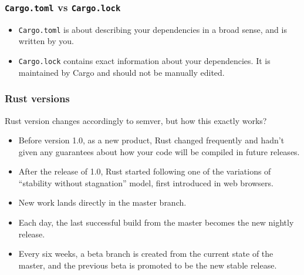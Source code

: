 \documentclass[aspectratio=1610,t]{beamer}
\begin{document}

\begin{frame}[fragile]
\frametitle{\texttt{Cargo.toml} vs \texttt{Cargo.lock}}
\begin{itemize}
    \item \texttt{Cargo.toml} is about describing your dependencies in a broad sense, and is written by you.
    \item \texttt{Cargo.lock} contains exact information about your dependencies. It is maintained by Cargo and should not be manually edited.
\end{itemize}



\end{frame}


\begin{frame}[fragile]
\frametitle{Rust versions}
Rust version changes accordingly to semver, but how this exactly works?

\begin{itemize}
    \item<1-> Before version 1.0, as a new product, Rust changed frequently and hadn't given any guarantees about how your code will be compiled in future releases.
    \item<2-> After the release of 1.0, Rust started following one of the variations of ``stability without stagnation'' model, first introduced in web browsers.
    \item<3-> New work lands directly in the master branch.
    \item<4-> Each day, the last successful build from the master becomes the new nightly release.
    \item<5-> Every six weeks, a beta branch is created from the current state of the master, and the previous beta is promoted to be the new stable release.
\end{itemize}
\end{frame}
\end{document}
